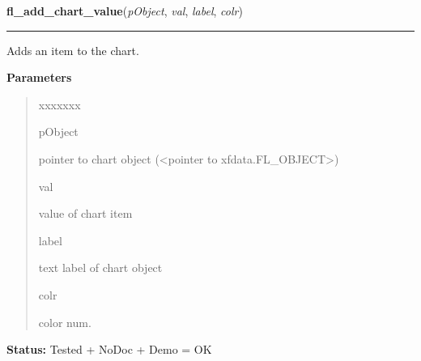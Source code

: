 \hspace{.8\funcindent}\begin{boxedminipage}{\funcwidth}

    \raggedright \textbf{fl\_add\_chart\_value}(\textit{pObject}, \textit{val}, \textit{label}, \textit{colr})

    \vspace{-1.5ex}

    \rule{\textwidth}{0.5\fboxrule}
\setlength{\parskip}{2ex}
    Adds an item to the chart.

\setlength{\parskip}{1ex}
      \textbf{Parameters}
      \vspace{-1ex}

      \begin{quote}
        \begin{Ventry}{xxxxxxx}

          \item[pObject]

          pointer to chart object ({\textless}pointer to 
          xfdata.FL\_OBJECT{\textgreater})

          \item[val]

          value of chart item

          \item[label]

          text label of chart object

          \item[colr]

          color num.

        \end{Ventry}

      \end{quote}

\textbf{Status:} Tested + NoDoc + Demo = OK



    \end{boxedminipage}

    \label{xformslib:library:fl_insert_chart_value}

    \vspace{0.5ex}

